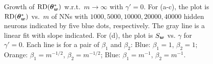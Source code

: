 \documentclass{article}
\begin{document}
\begin{figure}
    \centering
    \caption{Growth of $\mathrm{RD}(\bm{\theta}^*_{\bm{w}})$ w.r.t.\ $m\to\infty$ with $\gamma'=0$. For (a-c), the plot is $\mathrm{RD}(\bm{\theta}^*_{\bm{w}})$ vs.\ $m$ of NNs with $1000,5000,10000,20000,40000$ hidden neurons indicated by five blue dots, respectively. The gray line is a linear fit with slope indicated. For (d), the plot is $S_{\bm{w}}$ vs. $\gamma$ for $\gamma'=0$. Each line is for a pair of $\beta_1$ and $\beta_2$: Blue: $\beta_1=1$, $\beta_2=1$; Orange: $\beta_1=m^{-1/2}$, $\beta_2=m^{-1/2}$; Blue: $\beta_1=m^{-1}$, $\beta_2=m^{-1}$.}
    \label{fig:diffbeta}
\end{figure}
\end{document}
